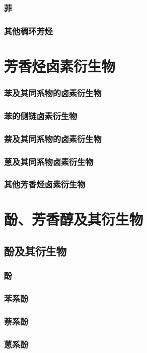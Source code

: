 \documentclass[UTF8]{../03-Chemistry}
\begin{document}
        \subsubsection{菲}
        \subsubsection{其他稠环芳烃}
\section{芳香烃卤素衍生物}
    \subsubsection{苯及其同系物的卤素衍生物}
    \subsubsection{苯的侧链卤素衍生物}
    \subsubsection{萘及其同系物的卤素衍生物}
    \subsubsection{蒽及其同系物卤素衍生物}
    \subsubsection{其他芳香烃卤素衍生物}
\section{酚、芳香醇及其衍生物}
    \subsection{酚及其衍生物}
        \subsubsection{酚}
        \subsubsection{苯系酚}
        \subsubsection{萘系酚}
        \subsubsection{蒽系酚}
\end{document}
